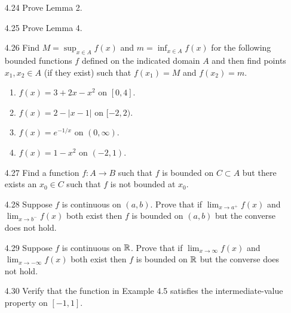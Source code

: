 \begin{enumerate}
   \item[4.24] Prove Lemma 2.
   \item[4.25] Prove Lemma 4.
   \item[4.26] Find $M = \sup_{x \in A} f(x)$ and $m = \inf_{x \in A} f(x)$ for
               the following bounded functions $f$ defined on the indicated
               domain $A$ and then find points $x_1, x_2 \in A$ (if they exist)
               such that $f(x_1) = M$ and $f(x_2) = m$.
               \begin{enumerate}
                  \item $f(x) = 3 + 2x - x^2$ on $[0, 4]$.
                  \item $f(x) = 2 - |x - 1|$ on $[-2, 2)$.
                  \item $f(x) = e^{-1/x}$ on $(0, \infty)$.
                  \item $f(x) = 1 - x^2$ on $(-2, 1)$.
               \end{enumerate}
   \item[4.27] Find a function $f : A \rightarrow B$ such that $f$ is bounded on
               $C \subset A$ but there exists an $x_0 \in C$ such that $f$ is
               not bounded at $x_0$.
   \item[4.28] Suppose $f$ is continuous on $(a, b)$. Prove that if
               $\lim_{x\rightarrow a^+} f(x)$ and $\lim_{x\rightarrow b^-} f(x)$
               both exist then $f$ is bounded on $(a, b)$ but the converse does
               not hold.
   \item[4.29] Suppose $f$ is continuous on $\mathbb{R}$. Prove that if
               $\lim_{x\rightarrow\infty} f(x)$ and
               $\lim_{x\rightarrow-\infty} f(x)$ both exist then $f$ is bounded
               on $\mathbb{R}$ but the converse does not hold.
   \item[4.30] Verify that the function in Example 4.5 satisfies the
               intermediate-value property on $[-1, 1]$.

\end{enumerate}
